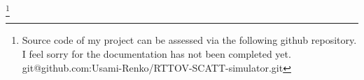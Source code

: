\documentclass[a4paper]{report}
\begin{document}




\tableofcontents
\thispagestyle{empty}
\setcounter{page}{0}







\footnote{Source code of my project can be assessed via the following github repository. I feel sorry for the documentation has not been completed yet.
git@github.com:Usami-Renko/RTTOV-SCATT-simulator.git}
\end{document}
